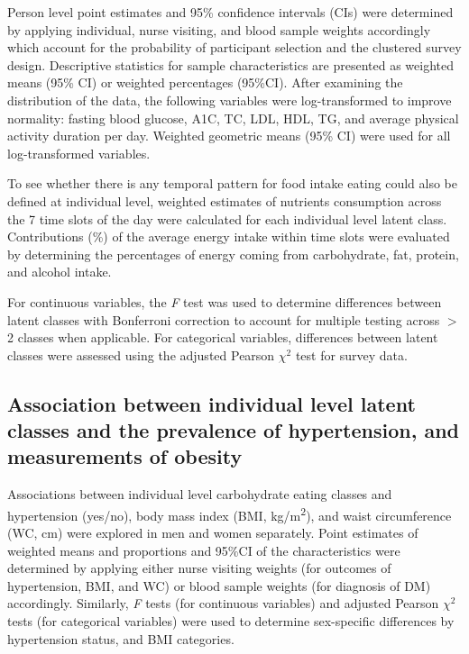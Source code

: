 Person level point estimates and 95\% confidence intervals (CIs) were determined by applying individual, nurse visiting, and blood sample weights accordingly which account for the probability of participant selection and the clustered survey design. Descriptive statistics for sample characteristics are presented as weighted means (95\% CI) or weighted percentages (95\%CI). After examining the distribution of the data, the following variables were log-transformed to improve normality: fasting blood glucose, A1C, TC, LDL, HDL, TG, and average physical activity duration per day. Weighted geometric means (95\% CI) were used for all log-transformed variables. 

To see whether there is any temporal pattern for food intake eating could also be defined at individual level, weighted estimates of nutrients consumption across the 7 time slots of the day were calculated for each individual level latent class. Contributions (\%) of the average energy intake within time slots were evaluated by determining the percentages of energy coming from carbohydrate, fat, protein, and alcohol intake. 

For continuous variables, the \textit{F} test was used to determine differences between latent classes with Bonferroni correction to account for multiple testing across $>$ 2 classes when applicable. For categorical variables, differences between latent classes were assessed using the adjusted Pearson $\chi^2$ test for survey data.\vspace{-0.5cm}


\subsection{Association between individual level latent classes and the prevalence of hypertension, and measurements of obesity}\vspace{-0.3cm}


Associations between individual level carbohydrate eating classes and hypertension (yes/no), body mass index (BMI, kg/m\textsuperscript{2}), and waist circumference (WC, cm) were explored in men and women separately. Point estimates of weighted means and proportions and 95\%CI of the characteristics were determined by applying either nurse visiting weights (for outcomes of hypertension, BMI, and WC) or blood sample weights (for diagnosis of DM) accordingly. Similarly, \textit{F} tests (for continuous variables) and adjusted Pearson $\chi^2$ tests (for categorical variables) were used to determine sex-specific differences by hypertension status, and BMI categories. 

